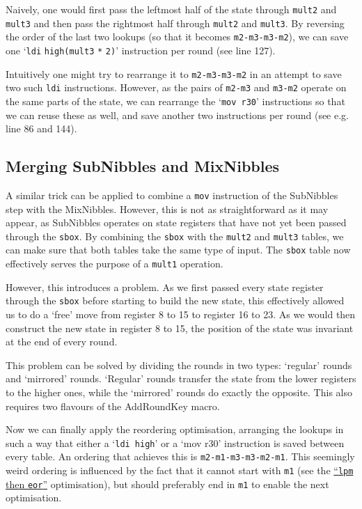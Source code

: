 \documentclass[a4paper]{article}
\begin{document}
Naively, one would first pass the leftmost half of the state through \texttt{mult2} and \texttt{mult3} and then pass the rightmost half through \texttt{mult2} and \texttt{mult3}. By reversing the order of the last two lookups (so that it becomes \texttt{m2-m3-m3-m2}), we can save one `\texttt{ldi} \texttt{high(mult3} \texttt{*} \texttt{2)}' instruction per round (see line 127).

Intuitively one might try to rearrange it to \texttt{m2-m3-m3-m2} in an attempt to save two such \texttt{ldi} instructions. However, as the pairs of \texttt{m2-m3} and \texttt{m3-m2} operate on the same parts of the state, we can rearrange the `\texttt{mov r30}' instructions so that we can reuse these as well, and save another two instructions per round (see e.g. line 86 and 144).

\subsection*{Merging SubNibbles and MixNibbles}

A similar trick can be applied to combine a \texttt{mov} instruction of the SubNibbles step with the MixNibbles. However, this is not as straightforward as it may appear, as SubNibbles operates on state registers that have not yet been passed through the \texttt{sbox}. By combining the \texttt{sbox} with the \texttt{mult2} and \texttt{mult3} tables, we can make sure that both tables take the same type of input. The \texttt{sbox} table now effectively serves the purpose of a \texttt{mult1} operation.

However, this introduces a problem. As we first passed every state register through the \texttt{sbox} before starting to build the new state, this effectively allowed us to do a `free' move from register 8 to 15 to register 16 to 23. As we would then construct the new state in register 8 to 15, the position of the state was invariant at the end of every round.

This problem can be solved by dividing the rounds in two types: `regular' rounds and `mirrored' rounds. `Regular' rounds transfer the state from the lower registers to the higher ones, while the `mirrored' rounds do exactly the opposite. This also requires two flavours of the AddRoundKey macro.

Now we can finally apply the reordering optimisation, arranging the lookups in such a way that either a `\texttt{ldi high}' or a `mov r30' instruction is saved between every table. An ordering that achieves this is 
\texttt{m2-m1-m3-m3-m2-m1}. This seemingly weird ordering is influenced by the fact that it cannot start with \texttt{m1} (see the \hyperlink{lpmtheneor}{``\texttt{lpm} then \texttt{eor}''} optimisation), but should preferably end in \texttt{m1} to enable the next optimisation.
\end{document}
